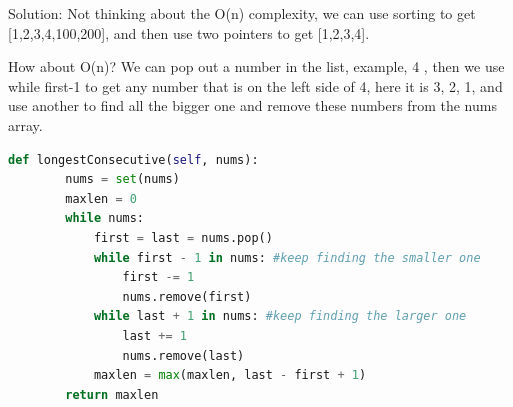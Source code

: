 \documentclass[../../../main.tex]{subfiles}
\begin{document}
Solution: Not thinking about the O(n) complexity, we can use sorting to get [1,2,3,4,100,200], and then use two pointers to get [1,2,3,4].

How about O(n)? We can pop out a number in the list, example, 4 , then we use while first-1 to get any number that is on the left side of 4, here it is 3, 2, 1, and use another to find all the bigger one and remove these numbers from the nums array.
\begin{lstlisting}[language =Python]
def longestConsecutive(self, nums):
        nums = set(nums)
        maxlen = 0
        while nums:
            first = last = nums.pop()
            while first - 1 in nums: #keep finding the smaller one
                first -= 1
                nums.remove(first)
            while last + 1 in nums: #keep finding the larger one
                last += 1
                nums.remove(last)
            maxlen = max(maxlen, last - first + 1)
        return maxlen
\end{lstlisting}
\end{document}
